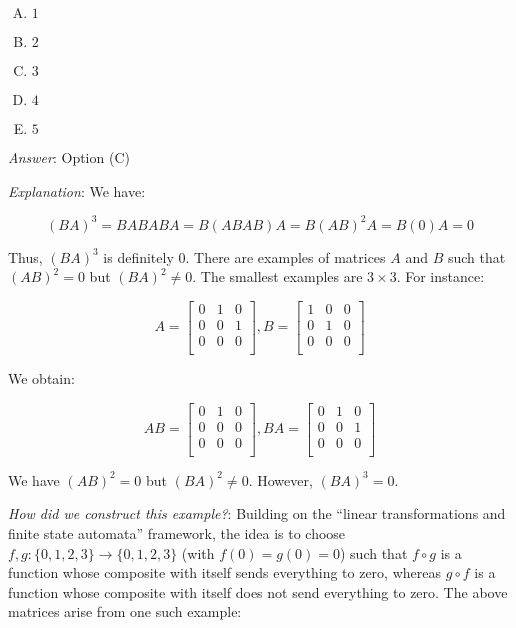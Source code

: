 \documentclass[10pt]{amsart}
\begin{document}
\begin{enumerate}
  \begin{enumerate}[(A)]
  \item $1$
  \item $2$
  \item $3$
  \item $4$
  \item $5$
  \end{enumerate}

  {\em Answer}: Option (C)

  {\em Explanation}: We have:

  $$(BA)^3 = BABABA = B(ABAB)A = B(AB)^2A = B(0)A = 0$$

  Thus, $(BA)^3$ is definitely $0$. There are examples of matrices $A$
  and $B$ such that $(AB)^2 = 0$ but $(BA)^2 \ne 0$. The smallest
  examples are $3 \times 3$. For instance:

  $$A = \left[\begin{matrix} 0 & 1 & 0 \\ 0 & 0 & 1 \\ 0 & 0 & 0 \\\end{matrix}\right], B = \left[\begin{matrix} 1 & 0 & 0 \\ 0 & 1 & 0 \\ 0 & 0 & 0 \\\end{matrix}\right]$$

  We obtain:

  $$AB = \left[\begin{matrix} 0 & 1 & 0 \\ 0 & 0 & 0 \\ 0 & 0 & 0 \\\end{matrix}\right], BA = \left[\begin{matrix} 0 & 1 & 0 \\ 0 & 0 & 1 \\ 0 & 0 & 0 \\\end{matrix}\right]$$

  We have $(AB)^2 = 0$ but $(BA)^2 \ne 0$. However, $(BA)^3 = 0$.

  {\em How did we construct this example?}: Building on the ``linear
  transformations and finite state automata'' framework, the idea is
  to choose $f,g: \{ 0,1,2,3 \} \to \{ 0,1,2,3 \}$ (with $f(0) = g(0)
  = 0$) such that $f \circ g$ is a function whose composite with itself
  sends everything to zero, whereas $g \circ f$ is a function whose
  composite with itself does not send everything to zero. The above
  matrices arise from one such example:


\end{enumerate}
\end{document}
